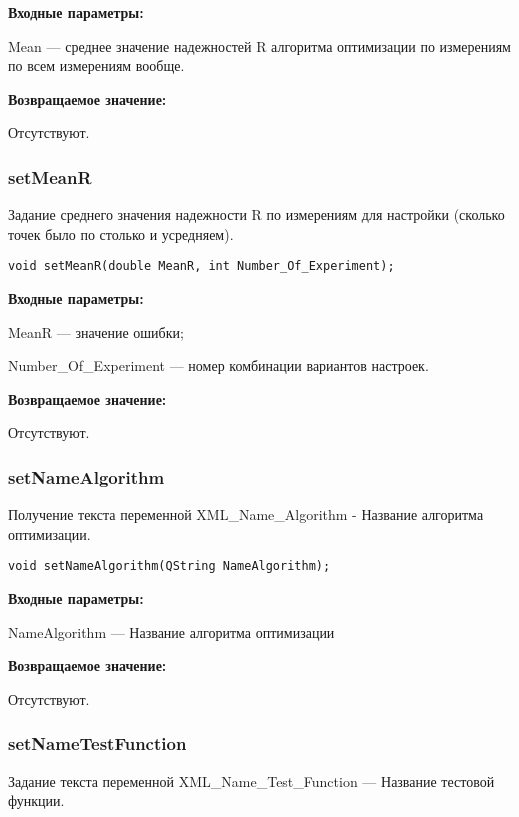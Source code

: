 \documentclass[a4paper,12pt]{article}
\begin{document}
\textbf{Входные параметры:}

Mean --- среднее значение надежностей R алгоритма оптимизации по измерениям по всем измерениям вообще.

\textbf{Возвращаемое значение:}

Отсутствуют.


\subsubsection{setMeanR}\label{setMeanR}

Задание среднего значения надежности R по измерениям для настройки (сколько точек было по столько и усредняем).


\begin{lstlisting}[label=code_syntax_setMeanR,caption=Синтаксис]
void setMeanR(double MeanR, int Number_Of_Experiment);
\end{lstlisting}

\textbf{Входные параметры:}

MeanR --- значение ошибки;

Number\_Of\_Experiment --- номер комбинации вариантов настроек.

\textbf{Возвращаемое значение:}

Отсутствуют.


\subsubsection{setNameAlgorithm}\label{setNameAlgorithm}

Получение текста переменной  XML\_Name\_Algorithm - Название алгоритма оптимизации.


\begin{lstlisting}[label=code_syntax_setNameAlgorithm,caption=Синтаксис]
void setNameAlgorithm(QString NameAlgorithm);
\end{lstlisting}

\textbf{Входные параметры:}

NameAlgorithm --- Название алгоритма оптимизации

\textbf{Возвращаемое значение:}

Отсутствуют.


\subsubsection{setNameTestFunction}\label{setNameTestFunction}

Задание текста переменной  XML\_Name\_Test\_Function --- Название тестовой функции.
\end{document}
